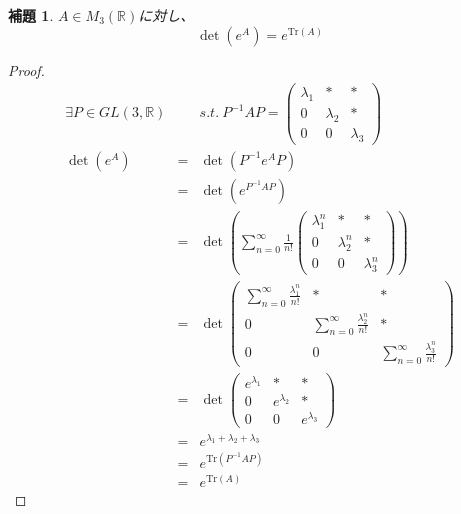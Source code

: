 \documentclass[10pt]{jarticle}
\newtheorem{Lem}{補題}[section]
\begin{document}
\begin{Lem} \label{lem:detTr}
    $A \in M_3(\mathbb{R})$に対し、
    \begin{equation}
        \det(e^A) = e^{\mathrm{Tr}(A)}
    \end{equation}
\end{Lem}

\begin{proof}
    \begin{eqnarray}
        \exists P\in GL(3,\mathbb{R})&&  s.t. \ 
        P^{-1}AP=
        \left(
          \begin{array}{ccc}
              \lambda_1 & * & * \\
              0 & \lambda_2 & * \\
              0 & 0 & \lambda_3
          \end{array}
        \right) \nonumber\\
        \det(e^A)&=&\det(P^{-1}e^AP) \nonumber\\
        &=&\det(e^{P^{-1}AP}) \nonumber\\
        &=&\det(\sum_{n=0}^{\infty}\frac{1}{n!}
        \left(
          \begin{array}{ccc}
              \lambda_1^n & * & * \\
              0 & \lambda_2^n & * \\
              0 & 0 & \lambda_3^n
          \end{array}
        \right)
        ) \nonumber\\
        &=&\det
        \left(
          \begin{array}{ccc}
              \sum_{n=0}^{\infty}\frac{\lambda_1^n}{n!} & * & * \\
              0 & \sum_{n=0}^{\infty}\frac{\lambda_2^n}{n!} & * \\
              0 & 0 & \sum_{n=0}^{\infty}\frac{\lambda_3^n}{n!}
          \end{array}
        \right) \nonumber\\
        &=&\det
        \left(
          \begin{array}{ccc}
              e^{\lambda_1} & * & * \\
              0 & e^{\lambda_2} & * \\
              0 & 0 & e^{\lambda_3}
          \end{array}
        \right) \nonumber\\
        &=&e^{\lambda_1+\lambda_2+\lambda_3} \nonumber\\
        &=&e^{\mathrm{Tr}(P^{-1}AP)} \nonumber\\
        &=&e^{\mathrm{Tr}(A)} \nonumber
    \end{eqnarray}
\end{proof}
\end{document}
